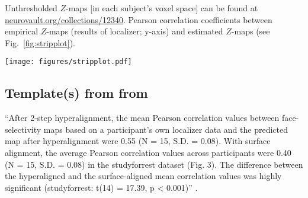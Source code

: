 

Unthresholded $Z$-maps [in each subject's voxel space] can be found at
\href{https://identifiers.org/neurovault.collection:12340}{\url{neurovault.org/collections/12340}}.
%
Pearson correlation coefficients between empirical $Z$-maps (results of
localizer; y-axis) and estimated $Z$-maps (see Fig.~\ref{fig:stripplot}).



\begin{figure*}[tbp] \centering
    \texttt{[image: figures/stripplot.pdf]} \caption{
    \textbf{Correlations between empirical and predicted
    \textit{\textbf{Z}}-maps.}
    Grey dots: A left-out subject's $Z$-map was estimated by projecting all
    other subjects ($N = 13$) $Z$-maps through the MNI152 space into the
    left-out subject space and averaging values across subject; correlations
    between empirical values from the localizer \& the predicted values using
    anatomical alignment.
    Green dots: estimation from visual localizer.
    Blue dots: transformation matrices computed based on an increasing number of
    segments of the audio-description; correlations between empirical values \&
    the predicted values using parts of the audio-description.
    Red dots: transformation matrices computed based on an increasing number of
    segments of the movie; correlations between empirical values \& the
    predicted values using parts of the movie.
}
\label{fig:stripplot}
\end{figure*}


\subsection{Template(s) from from \citet{jiahui2020predicting}}

%
``After 2-step hyperalignment, the mean Pearson correlation values between
face-selectivity maps based on a participant's own localizer data and the
predicted map after hyperalignment were 0.55 (N = 15, S.D. = 0.08).
%
With surface alignment, the average Pearson correlation values across
participants were 0.40 (N = 15, S.D. = 0.08) in the studyforrest dataset (Fig.
3).
%
The difference between the hyperaligned and the surface-aligned mean correlation
values was highly significant (studyforrest: t(14) = 17.39, p < 0.001)''
\citep{jiahui2020predicting}.



